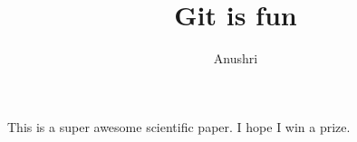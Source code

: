 \documentclass[10pt]{article}
\author{Anushri}
\title{Git is fun}
\begin{document}
	\maketitle
	
	This is a super awesome scientific paper.
	I hope I win a prize.
\end{document}

